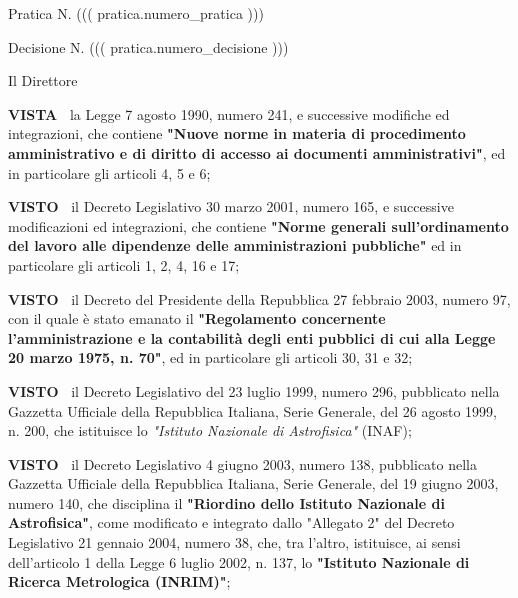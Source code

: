 \documentclass[a4paper,12pt]{letter}
\begin{document}
\topaddr


Pratica N. ((( pratica.numero_pratica )))

\begin{flushright}
Decisione N. ((( pratica.numero_decisione )))
\end{flushright}

\begin{center}

Il Direttore

\end{center}
\textbf{VISTA~}	la Legge 7 agosto 1990, numero 241, e successive modifiche
ed integrazioni, che contiene \textbf{"Nuove norme in materia di procedimento
amministrativo e di diritto di accesso ai documenti amministrativi"},
ed in particolare gli articoli 4, 5 e 6;

\textbf{VISTO~}	il Decreto Legislativo 30 marzo 2001, numero 165, e
successive modificazioni ed integrazioni, che contiene \textbf{"Norme generali
sull’ordinamento del lavoro alle dipendenze delle amministrazioni
pubbliche"} ed in particolare gli articoli 1, 2, 4, 16 e 17;

\textbf{VISTO~}	il Decreto del Presidente della Repubblica 27 febbraio
2003, numero 97, con il quale è stato emanato il \textbf{"Regolamento concernente
l’amministrazione e la contabilità degli enti pubblici di cui alla
Legge 20 marzo 1975, n. 70"}, ed in particolare gli articoli 30, 31 e 32;

\textbf{VISTO~}	il Decreto Legislativo del 23 luglio 1999, numero 296,
pubblicato nella Gazzetta Ufficiale della Repubblica Italiana, Serie
Generale, del 26 agosto 1999, n. 200, che istituisce lo \textit{"Istituto
Nazionale di Astrofisica"} (INAF);

\textbf{VISTO~}	il Decreto Legislativo 4 giugno 2003, numero 138,
pubblicato nella Gazzetta Ufficiale della Repubblica Italiana, Serie
Generale, del 19 giugno 2003, numero 140, che disciplina il \textbf{"Riordino
dello Istituto Nazionale di Astrofisica"}, come modificato e integrato
dallo "Allegato 2" del Decreto Legislativo 21 gennaio 2004, numero 38,
che, tra l’altro, istituisce, ai sensi dell’articolo 1 della Legge
6 luglio 2002, n. 137, lo \textbf{"Istituto Nazionale di Ricerca Metrologica
(INRIM)"};
\end{document}
